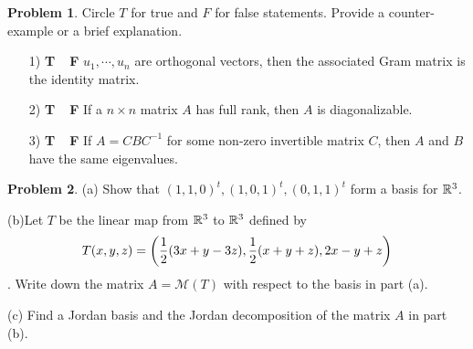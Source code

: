 \documentclass[12pt]{amsart}
\theoremstyle{definition}
\newtheorem{prob}{Problem}
\begin{document}
\vspace{2em}
\begin{prob}
	Circle $T$ for true and $F$ for false statements. Provide a counter-example or a brief explanation.
	\begin{enumerate}
		\item[1)  {\bf T\ \  F}]\quad $u_1,\cdots,u_n$ are orthogonal vectors, then the associated Gram matrix is the identity matrix.		\vspace{4cm}
\item[2)  {\bf T\ \  F}]\quad  If a $n\times n$ matrix $A$ has full rank, then $A$ is diagonalizable. 
  \vspace{5cm}
  \item[3)  {\bf T\ \  F}] If $A=CBC^{-1}$ for some non-zero invertible matrix $C$, then $A$ and $B$ have the same eigenvalues.\quad  
  \end{enumerate}
 \end{prob}
 \newpage
  


\begin{prob}
	(a) Show that $(1,1,0)^t,(1,0,1)^t,(0,1,1)^t$ form a basis for $\mathbb{R}^3$.
	
	(b)Let $T$ be the linear map from $\mathbb{R}^3$ to $\mathbb{R}^3$ defined by $$T(x,y,z)=\left({1\over 2}{(3x+y-3z)},{1\over 2}(x+y+z),2x-y+z\right)$$. Write down the matrix $A=\mathcal{M}(T)$ with respect to the basis in part (a).
	
	(c) Find a Jordan basis and the Jordan decomposition of the matrix $A$ in part (b).
\end{prob}
\end{document}
